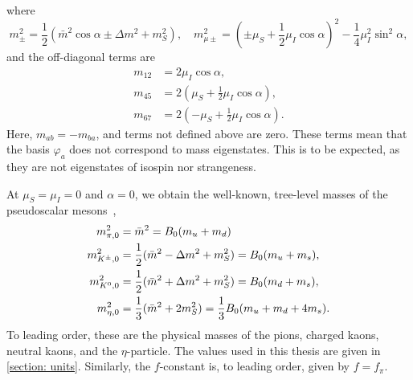 \endgroup
%
where
%
\begin{equation}
    \label{mass terms in pion condensate}
    m_\pm^2 = \frac{1}{2} (\bar m^2 \cos\alpha \pm \Delta m^2 + m_S^2),
    \quad
    m^2_{\mu\pm } = \left(\pm \mu_S + \frac{1}{2}\mu_I\cos\alpha \right)^2 
    - \frac{1}{4}\mu_I^2 \sin^2\alpha,
\end{equation}
and the off-diagonal terms are
\begin{align}
    \label{m12}
    m_{12} & = 2 \mu_I\cos\alpha,\\
    m_{45} & = 2 \left( \mu_S + \frac{1}{2} \mu_I  \cos\alpha\right), \\
    \label{m76}
    m_{67} & =  2 \left( - \mu_S + \frac{1}{2} \mu_I  \cos\alpha\right).
\end{align}
%
Here, $m_{ab} = -m_{ba}$, and terms not defined above are zero.
These terms mean that the basis $\varphi_a$ does not correspond to mass eigenstates.
This is to be expected, as they are not eigenstates of isospin nor strangeness.

At $\mu_S = \mu_I = 0$ and $\alpha = 0$, we obtain the well-known, tree-level masses of the pseudoscalar mesons~\autocite{eckerChiralPerturbationTheory1995},
%
\begin{align}
    \label{leading order pion mass mu=0}
    m_{\pi,0}^2 &
    = \bar m^2 
    = B_0(m_u + m_d)\\
    \label{leading order charged kaon mass mu=0}
    m_{{K^\pm}, 0}^2 
    & = \frac{1}{2} (\bar m^2 - \Delta m^2 + m_S^2) 
    = B_0(m_u + m_s), \\
    \label{leading order neutral kaon mass mu=0}
    m_{{K^0}, 0}^2
    & = \frac{1}{2} (\bar m^2 + \Delta m^2 + m_S^2) 
    = B_0(m_d + m_s), \\
    \label{leading order eta mass mu=0}
    m_{\eta, 0}^2
    &= \frac{1}{3}(\bar m^2  + 2m_S^2) 
    = \frac{1}{3}B_0(m_u + m_d + 4m_s).
\end{align}
%
To leading order, these are the physical masses of the pions, charged kaons, neutral kaons, and the $\eta$-particle.
The values used in this thesis are given in \autoref{section: units}.
Similarly, the $f$-constant is, to leading order, given by $f = f_\pi$.

